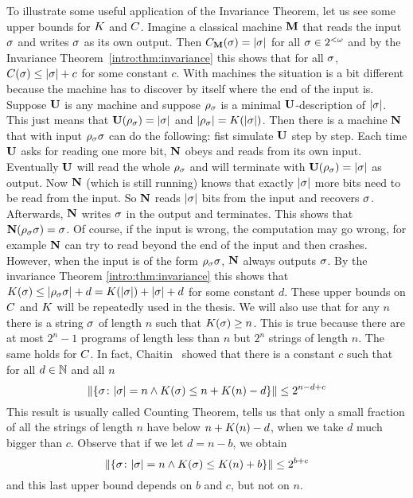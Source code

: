 To illustrate some useful application of the Invariance Theorem,
let us see some upper bounds for $K$ and $C$. Imagine a
classical machine ${\bf M}$ that reads the input $\sigma$ and writes
$\sigma$ as its own output. Then $C_{{\bf M}}(\sigma)=| \sigma |$ for all
$\sigma\in2^{<\omega}$ and by the Invariance
Theorem~\ref{intro:thm:invariance} this shows that for all $\sigma$,
$C(\sigma)\leq | \sigma |+c$ for some constant $c$. With \pfree
machines the situation is a bit different because the machine has
to discover by itself where the end of the input is. Suppose ${\bf U}$
is any \opt \pfree machine and suppose $\rho_\sigma$ is a minimal
${\bf U}$-description of $| \sigma |$. This just means that
${\bf U}(\rho_\sigma)=| \sigma |$ and $| \rho_\sigma |=K(| \sigma |)$.
Then there is a \pfree machine ${\bf N}$ that with input
$\rho_\sigma\sigma$ can do the following: fist simulate ${\bf U}$ step by
step. Each time ${\bf U}$ asks for reading one more bit, ${\bf N}$ obeys and
reads from its own input. Eventually ${\bf U}$ will read the whole
$\rho_\sigma$ and will terminate with ${\bf U}(\rho_\sigma)=| \sigma |$ as
output. Now ${\bf N}$ (which is still running) knows that exactly
$| \sigma |$ more bits need to be read from the input. So ${\bf N}$
reads $| \sigma |$ bits from the input and recovers $\sigma$.
Afterwards, ${\bf N}$ writes $\sigma$ in the output and terminates. This
shows that ${\bf N}(\rho_\sigma\sigma)=\sigma$. Of course, if the input is
wrong, the computation may go wrong, for example ${\bf N}$ can try to
read beyond the end of the input and then crashes. However, when
the input is of the form $\rho_\sigma\sigma$, ${\bf N}$ always outputs
$\sigma$. By the invariance Theorem \ref{intro:thm:invariance} this
shows that $K(\sigma)\leq | \rho_\sigma\sigma | + d =
K(| \sigma |)+| \sigma |+d$ for some constant $d$. These upper
bounds on $C$ and $K$ will be repeatedly used in the thesis. We
will also use that for any $n$ there is a string $\sigma$ of length
$n$ such that $K(\sigma)\geq n$. This is true because there are at
most $2^n-1$ programs of length less than $n$ but $2^n$ strings of
length $n$. The same holds for $C$. In fact,
Chaitin~\cite{chaitin1975theory,C87b} showed that there is a constant $c$ such
that for all $d\in\mathbb{N}$ and all $n$
$$
\| \{ \sigma \colon | \sigma |=n \wedge K(\sigma)\leq n + K(n)-d
\} \| \leq 2^{n-d+c}
$$
This result is usually called Counting
Theorem, tells us that only a small fraction of all the strings of
length $n$ have \pfree \kolcomp below $n+K(n)-d$, when we take
$d$ much bigger than $c$.
Observe that if we let $d=n-b$, we obtain
$$
\| \{ \sigma \colon | \sigma |=n \wedge K(\sigma)\leq K(n)+b
\} \| \leq 2^{b+c}
$$
and this last upper bound depends on $b$ and $c$, but not on $n$.

